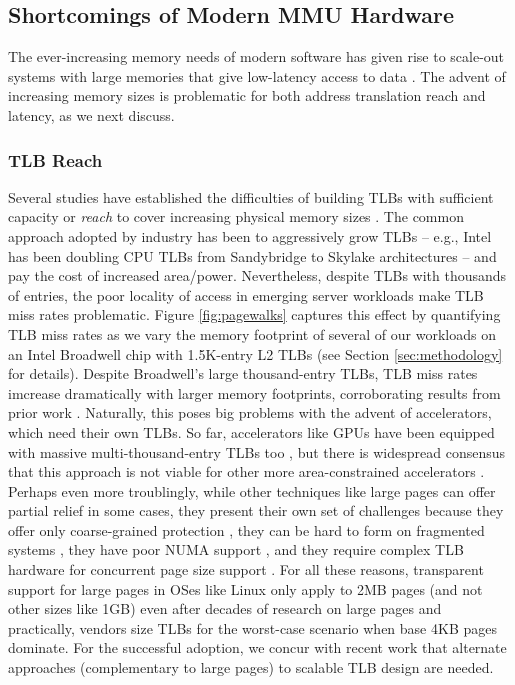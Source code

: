 \subsection{Shortcomings of Modern MMU Hardware}
The ever-increasing memory needs of modern software has given rise to
scale-out systems with large memories that give low-latency access to
data \cite{ferdman:clearing, karakostas:performance, volos:fat,
  basu:efficient}. The advent of increasing memory sizes is
problematic for both address translation reach and latency, as we next
discuss.

\subsubsection{TLB Reach}
Several studies have established the difficulties of building TLBs
with sufficient capacity or {\it reach} to cover increasing physical
memory sizes \cite{basu:efficient, haria:devirtualizing,
  pham:colt}. The common approach adopted by industry has been to
aggressively grow TLBs -- e.g., Intel has been doubling CPU TLBs from
Sandybridge to Skylake architectures -- and pay the cost of increased
area/power. Nevertheless, despite TLBs with thousands of entries, the
poor locality of access in emerging server workloads make TLB miss
rates problematic. Figure \ref{fig:pagewalks} captures this effect by
quantifying TLB miss rates as we vary the memory footprint of several
of our workloads on an Intel Broadwell chip with 1.5K-entry L2 TLBs
(see Section \ref{sec:methodology} for details). Despite Broadwell's
large thousand-entry TLBs, TLB miss rates imcrease dramatically with
larger memory footprints, corroborating results from prior work
\cite{basu:efficient}. Naturally, this poses big problems with the
advent of accelerators, which need their own TLBs. So far,
accelerators like GPUs have been equipped with massive
multi-thousand-entry TLBs too \cite{vesely:observation,
  lowepower:inferring}, but there is widespread consensus that this
approach is not viable for other more area-constrained accelerators
\cite{haria:devirtualizing, picorel:near-memory}. Perhaps even more
troublingly, while other techniques like large pages can offer partial
relief in some cases, they present their own set of challenges because
they offer only coarse-grained protection \cite{pham:large}, they can
be hard to form on fragmented systems \cite{kwon:coordinated}, they
have poor NUMA support \cite{gaud:large}, and they require complex TLB
hardware for concurrent page size support \cite{cox:efficient}. For
all these reasons, transparent support for large pages in OSes like
Linux only apply to 2MB pages (and not other sizes like 1GB) even
after decades of research on large pages \cite{arcangeli:transparent}
and practically, vendors size TLBs for the worst-case scenario when
base 4KB pages dominate. For the successful adoption, we concur with
recent work \cite{pham:colt, basu:efficient, karakostas:redundant,
  haria:devirtualizing} that alternate approaches (complementary to
large pages) to scalable TLB design are needed.

